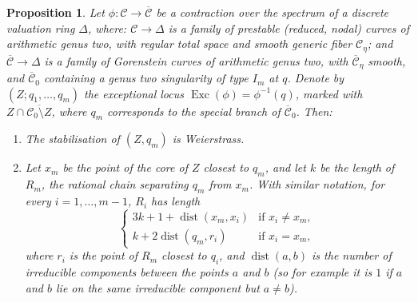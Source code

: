 \documentclass[11pt]{amsart}
\renewcommand{\to}{\rightarrow}
\newcommand{\dvr}{\Delta}
\newcommand{\dist}{\operatorname{dist}}
\newcommand{\Exc}{\operatorname{Exc}}
\theoremstyle{plain}
\newtheorem{prop}[thm]{Proposition}
\theoremstyle{definition}
\begin{document}
\begin{prop}\label{prop:tailI}
 Let $\phi\colon\mathcal C\to\overline{\mathcal C}$ be a contraction over the spectrum of a discrete valuation ring $\dvr$, where: $\mathcal C\to \dvr$ is a family of prestable (reduced, nodal) curves of arithmetic genus two, with regular total space and smooth generic fiber $\mathcal C_{\eta}$; and $\overline{\mathcal C}\to\dvr$ is a family of Gorenstein curves of arithmetic genus two, with $\overline{\mathcal C}_{\eta}$ smooth, and $\overline{\mathcal C}_0$ containing a genus two singularity of type $I_m$ at $q$. Denote by $(Z;q_1,\ldots,q_m)$ the exceptional locus $\Exc(\phi)=\phi^{-1}(q)$, marked with $Z\cap\overline{\mathcal C_0\setminus Z}$, where $q_m$ corresponds to the special branch of $\overline{\mathcal C}_0$. Then:
 \begin{enumerate}[leftmargin=.6cm]
  \item The stabilisation of $(Z,q_m)$ is Weierstrass.
  \item Let $x_m$ be the point of the core of $Z$ closest to $q_m$, and let $k$ be the length of $R_m$, the rational chain separating $q_m$ from $x_m$. With similar notation, for every $i=1,\ldots,m-1$, $R_i$ has length 
  \begin{equation*}
  \begin{cases}
   3k+1+\dist(x_m,x_i) & \text{if } x_i\neq x_m,\\
   k+2\dist(q_m,r_i)  & \text{if } x_i=x_m,
  \end{cases} 
  \end{equation*}
 where $r_i$ is the point of $R_m$ closest to $q_i$, and $\dist(a,b)$ is the number of irreducible components between the points $a$ and $b$ (so for example it is $1$ if $a$ and $b$ lie on the same irreducible component but $a\neq b$).
 \end{enumerate}
\end{prop}
\end{document}
